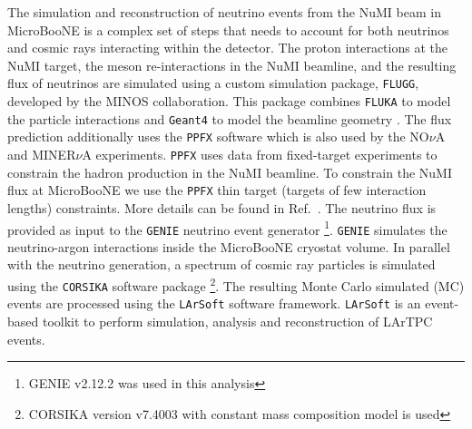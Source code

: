 \documentclass[%
 reprint,
 twocolumn,
superscriptaddress,
showpacs,preprintnumbers,
 amsmath,amssymb,
 aps,
prd,
longbibliography
]{revtex4-1}
\begin{document}
The simulation and reconstruction of neutrino events from the NuMI beam in MicroBooNE is a complex set of steps that needs to account for both neutrinos and cosmic rays interacting within the detector. %
The proton interactions at the NuMI target, the meson re-interactions in the NuMI beamline, and the resulting flux of neutrinos are simulated using a custom simulation package, \texttt{FLUGG}, developed by the MINOS collaboration. This package combines \texttt{FLUKA} \cite{Fasso:1993kr} to model the particle interactions and \texttt{Geant4} \cite{Agostinelli:2002hh} to model the beamline geometry \cite{Campanella:683723}. The flux prediction additionally uses the \texttt{PPFX} software \cite{AliagaSoplin:2016shs} which is also used by the NO$\nu$A and MINER$\nu$A experiments. \texttt{PPFX} uses data from fixed-target experiments to constrain the hadron production in the NuMI beamline.
To constrain the NuMI flux at MicroBooNE we use the \texttt{PPFX} thin target (targets of few interaction lengths) constraints. More details can be found in Ref.~\cite{AliagaSoplin:2016shs}. The neutrino flux is provided as input to the \texttt{GENIE} \cite{genie_manual} neutrino event generator \footnote{GENIE v2.12.2 was used in this analysis}. \texttt{GENIE} simulates the neutrino-argon interactions inside the MicroBooNE cryostat volume. 
In parallel with the neutrino generation, a spectrum of cosmic ray particles is simulated using the \texttt{CORSIKA} \cite{corsika} software package \footnote{CORSIKA version v7.4003 with constant mass composition model is used}. The resulting Monte Carlo simulated (MC) events are processed using the \texttt{LArSoft} \cite{Snider:2017wjd} software framework. \texttt{LArSoft} is an event-based toolkit to perform simulation, analysis and reconstruction of LArTPC events. 
\end{document}
